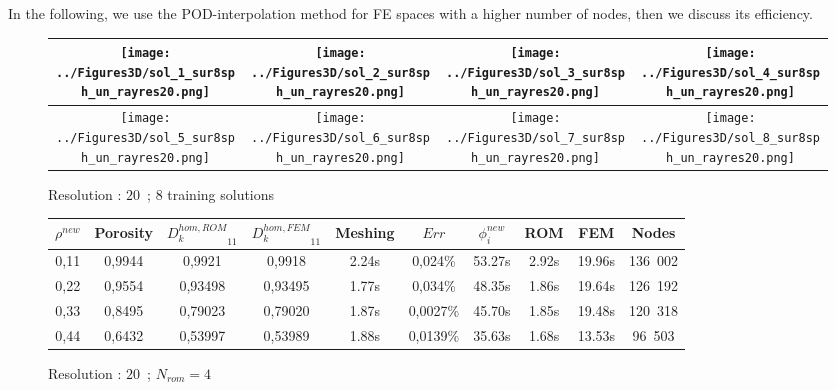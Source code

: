 {\ligneinter
In the following, we use the POD-interpolation method for FE spaces with a higher number of nodes, %
then we discuss its efficiency.

\begin{figure}[H]%
%
\begin{center}
\begin{tabular}{|c|c|c|c|}
\hline
\texttt{[image: ../Figures3D/sol\_1\_sur8sph\_un\_rayres20.png]}%
&%
\texttt{[image: ../Figures3D/sol\_2\_sur8sph\_un\_rayres20.png]}%
&%
\texttt{[image: ../Figures3D/sol\_3\_sur8sph\_un\_rayres20.png]}%
&%
\texttt{[image: ../Figures3D/sol\_4\_sur8sph\_un\_rayres20.png]}%
\\
\hline
\texttt{[image: ../Figures3D/sol\_5\_sur8sph\_un\_rayres20.png]}%
&%
\texttt{[image: ../Figures3D/sol\_6\_sur8sph\_un\_rayres20.png]}%
&%
\texttt{[image: ../Figures3D/sol\_7\_sur8sph\_un\_rayres20.png]}%
&%
\texttt{[image: ../Figures3D/sol\_8\_sur8sph\_un\_rayres20.png]}%
\\
\hline
\end{tabular}
\end{center}
\caption{Resolution : $20$\ ; $8$ training solutions}
%
\end{figure}

\begin{figure}[H]%
%
\begin{center}
\begin{tabular}{|c|c||c|c||c|c||c|c||c||c|}
\hline
\rowcolor{lightgray} $\rho^{new}$&Porosity&${D_k^{hom,ROM}}_{11}$&${D_k^{hom,FEM}}_{11}$&Meshing&$Err$&$\phi_i^{new}$&ROM&FEM&Nodes\\
\hline
0,11&0,9944&0,9921&0,9918&2.24s&0,024\%&53.27s&2.92s&19.96s&136\ 002\\
\hline
0,22&0,9554&0,93498&0,93495&1.77s&0,034\%&48.35s&1.86s&19.64s&126\ 192\\
\hline
0,33&0,8495&0,79023&0,79020&1.87s&0,0027\%&45.70s&1.85s&19.48s&120\ 318\\
\hline
0,44&0,6432&0,53997&0,53989&1.88s&0,0139\%&35.63s&1.68s&13.53s&96\ 503\\
\hline
\end{tabular}
\end{center}
\caption{Resolution : $20$\ ; $N_{rom}=4$}
%
\end{figure}

}

